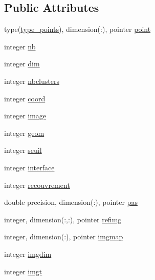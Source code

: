 \subsection*{Public Attributes}
\begin{DoxyCompactItemize}
\item 
type(\hyperlink{structmodule__structure_1_1type__points}{type\+\_\+points}), dimension(\+:), pointer \hyperlink{structmodule__structure_1_1type__data_abf37f99fee0c2349e30eeb7154a83781}{point}
\item 
integer \hyperlink{structmodule__structure_1_1type__data_aeda213b55a528437b4c0c62419c7ea16}{nb}
\item 
integer \hyperlink{structmodule__structure_1_1type__data_a34f9035cfb1ea16372e037570762092b}{dim}
\item 
integer \hyperlink{structmodule__structure_1_1type__data_a4d92879e85d1d01490acc4dfcd2cb919}{nbclusters}
\item 
integer \hyperlink{structmodule__structure_1_1type__data_ac7205be3a73581de07ce87c73512e053}{coord}
\item 
integer \hyperlink{structmodule__structure_1_1type__data_ad94fb30180d08b822535fe3871a6f8e5}{image}
\item 
integer \hyperlink{structmodule__structure_1_1type__data_aea3be74c0bedcbf99fcdb1667557f0f7}{geom}
\item 
integer \hyperlink{structmodule__structure_1_1type__data_a3ee52c32703411f359fba32fc811dafb}{seuil}
\item 
integer \hyperlink{structmodule__structure_1_1type__data_a96f87a53c6f8260511e272eae3890b14}{interface}
\item 
integer \hyperlink{structmodule__structure_1_1type__data_a48f072d67251fec80f72a58076491ca7}{recouvrement}
\item 
double precision, dimension(\+:), pointer \hyperlink{structmodule__structure_1_1type__data_ac7bbaf17e7397368148e848611d34244}{pas}
\item 
integer, dimension(\+:,\+:), pointer \hyperlink{structmodule__structure_1_1type__data_acb77a7774d04786633bf0ef6482a5d00}{refimg}
\item 
integer, dimension(\+:), pointer \hyperlink{structmodule__structure_1_1type__data_a923214c4f0d6d624a16e2320cf461093}{imgmap}
\item 
integer \hyperlink{structmodule__structure_1_1type__data_ae1e79afbe614fabb6bcc79837f40b75f}{imgdim}
\item 
integer \hyperlink{structmodule__structure_1_1type__data_a55743cf7c72081de117e4160110ed553}{imgt}
\end{DoxyCompactItemize}



